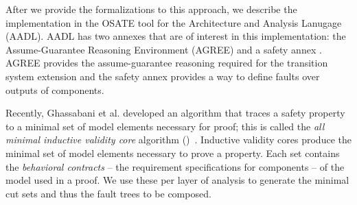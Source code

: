 After we provide the formalizations to this approach, we describe the implementation in the OSATE tool for the Architecture and Analysis Lanugage (AADL). AADL has two annexes that are of interest in this implementation: the Assume-Guarantee Reasoning Environment (AGREE) and a safety annex . AGREE provides the assume-guarantee reasoning required for the transition system extension and the safety annex provides a way to define faults over outputs of components. 

Recently, Ghassabani et al. developed an algorithm that traces a safety property to a minimal set of model elements necessary for proof; this is called the \textit{all minimal inductive validity core} algorithm (\aivcalg)~\cite{GhassabaniGW16,Ghassabani2017EfficientGO,bendik2018online}. Inductive validity cores produce the minimal set of model elements necessary to prove a property. Each set contains the \emph{behavioral contracts} -- the requirement specifications for components -- of the model used in a proof. We use these per layer of analysis to generate the minimal cut sets and thus the fault trees to be composed.




